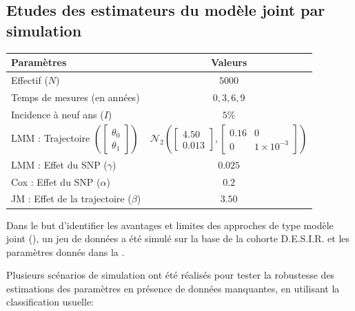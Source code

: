 \documentclass[11pt, a4paper]{article}
\begin{document}
\subsection{Etudes des estimateurs du modèle joint par simulation}
\begin{table}[h]
    \begin{center}
        \begin{tabular}{lc}
            \hline
            Paramètres & Valeurs\\
            \hline
            Effectif ($N$) & $5000$\\
            Temps de mesures (en années) & $0, 3, 6, 9$\\
            Incidence à neuf ans ($I$) & $5\%$\\
            LMM : Trajectoire $\left (\begin{bmatrix}\theta_{0}\\\theta_{1}\end{bmatrix}\right )$ & $\mathcal{N}_2\left (\begin{bmatrix}4.50\\0.013\end{bmatrix} , \begin{bmatrix} 0.16 & 0 \\ 0 & 1\times 10^{-3} \end{bmatrix} \right )$\\
            LMM : Effet du SNP ($\gamma$) & $0.025$\\
            Cox : Effet du SNP ($\alpha$) & $0.2$\\
            JM : Effet de la trajectoire ($\beta$) & $3.50$\\
            \hline
        \end{tabular}
    \end{center}
    \vspace{-15pt}
    \label{tab:simpar}
\end{table}
\par{Dans le but d’identifier les avantages et limites des approches de type modèle joint (),
un jeu de données a été simulé sur la base de la cohorte D.E.S.I.R. et les paramètres donnés dans la .
}
\par{Plusieurs scénarios de simulation ont été réalisés pour tester la robustesse des estimations des paramètres
en présence de données manquantes, en utilisant la classification usuelle:}
\end{document}
